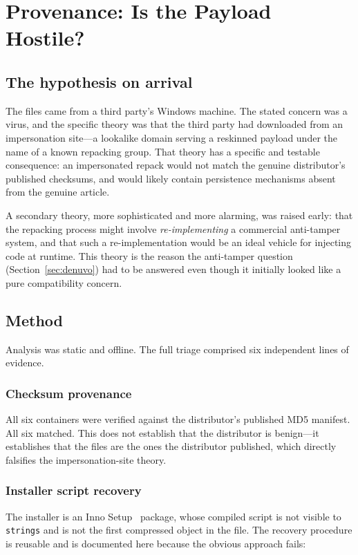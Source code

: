 \section{Provenance: Is the Payload Hostile?}
\label{sec:malware}

\subsection{The hypothesis on arrival}

The files came from a third party's Windows machine. The stated concern was a
virus, and the specific theory was that the third party had downloaded from an
impersonation site---a lookalike domain serving a reskinned payload under the
name of a known repacking group. That theory has a specific and testable
consequence: an impersonated repack would not match the genuine distributor's
published checksums, and would likely contain persistence mechanisms absent from
the genuine article.

A secondary theory, more sophisticated and more alarming, was raised early: that
the repacking process might involve \emph{re-implementing} a commercial
anti-tamper system, and that such a re-implementation would be an ideal vehicle
for injecting code at runtime. This theory is the reason the anti-tamper question
(Section~\ref{sec:denuvo}) had to be answered even though it initially looked
like a pure compatibility concern.

\subsection{Method}

Analysis was static and offline. The full triage comprised six independent
lines of evidence.

\subsubsection{Checksum provenance}
All six containers were verified against the distributor's published MD5
manifest. All six matched. This does not establish that the distributor is
benign---it establishes that the files are the ones the distributor published,
which directly falsifies the impersonation-site theory.

\subsubsection{Installer script recovery}
The installer is an Inno Setup~\cite{innosetup} package, whose compiled script is
not visible to \verb|strings| and is not the first compressed object in the file.
The recovery procedure is reusable and is documented here because the obvious
approach fails:

